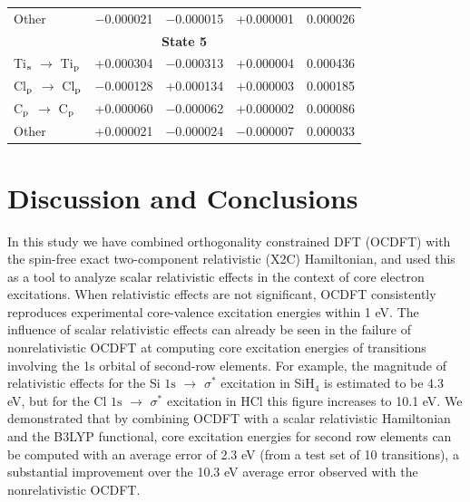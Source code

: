 \documentclass{article}
\begin{document}
\begin{table}[t!]
\begin{tabular}{lcccc}
Other       & $-$0.000021 & $-$0.000015 & +0.000001 & 0.000026 \\
\multicolumn{5}{c}{{\bf{State 5}}}   \\
Ti$_{\rm s}$ $\rightarrow$ Ti$_{\rm p}$ & +0.000304 & $-$0.000313 & +0.000004 & 0.000436 \\
Cl$_{\rm p}$ $\rightarrow$ Cl$_{\rm p}$ & $-$0.000128 & +0.000134 & +0.000003 & 0.000185 \\
C$_{\rm p}$ $\rightarrow$ C$_{\rm p}$ & +0.000060 & $-$0.000062 & +0.000002 & 0.000086 \\
Other       & +0.000021 & $-$0.000024 & $-$0.000007 & 0.000033 \\
		 \bottomrule
	\end{tabular}
	\label{table:ti_analysis_dipole}
\end{table}

\section{Discussion and Conclusions}

In this study we have combined orthogonality constrained DFT (OCDFT) with the spin-free exact two-component relativistic (X2C) Hamiltonian, and used this as a tool to analyze scalar relativistic effects in the context of core electron excitations.  When relativistic effects are not significant, OCDFT consistently reproduces experimental core-valence excitation energies within 1 eV.
The influence of scalar relativistic effects can already be seen in the failure of nonrelativistic OCDFT at computing core excitation energies of transitions involving the 1s orbital of second-row elements. 
For example, the magnitude of relativistic effects for the Si $\text{1s}$ $\rightarrow$ $\sigma^*$ excitation in SiH$_4$ is estimated to be 4.3 eV, but for the Cl $\text{1s}$ $\rightarrow$ $\sigma^*$ excitation in HCl this figure increases to 10.1 eV. 
We demonstrated that by combining OCDFT with a scalar relativistic Hamiltonian and the B3LYP functional, core excitation energies for second row elements can be computed with an average error of 2.3 eV (from a test set of 10 transitions), a substantial improvement over the 10.3 eV average error observed with the nonrelativistic OCDFT.
\end{document}
